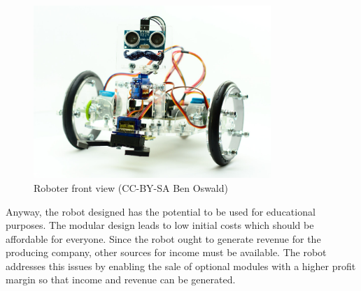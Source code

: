 \begin{figure}[H]
  \centering
  \includegraphics[width=0.8\textwidth]{images/30_robotfront.jpg}
  \caption{Roboter front view (CC-BY-SA Ben Oswald)}
\end{figure}


Anyway, the robot designed has the potential to be used for educational purposes. The modular design leads to low initial costs which should be affordable for everyone. Since the robot ought to generate revenue for the producing company, other sources for income must be available. The robot addresses this issues by enabling the sale of optional modules with a higher profit margin so that income and revenue can be generated.

